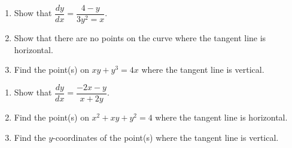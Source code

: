 \begin{enumerate}[label=\hspace{11pt}(\alph*), align=left, leftmargin=*, labelsep=0.25em]
    \item Show that $\dfrac{dy}{dx} = \dfrac{4 - y}{3y^2 = x}$.
    \item Show that there are no points on the curve where the tangent line is horizontal.
    \item Find the point(s) on $xy + y^3 = 4x$ where the tangent line is vertical.
\end{enumerate} \vspace{11pt}

\begin{enumerate}[label=\hspace{11pt}(\alph*), align=left, leftmargin=*, labelsep=0.25em]
    \item Show that $\dfrac{dy}{dx} = \dfrac{-2x - y}{x + 2y}$.
    \item Find the point(s) on $x^2 + xy + y^2 = 4$ where the tangent line is horizontal.
    \item Find the $y$-coordinates of the point(s) where the tangent line is vertical.
\end{enumerate}